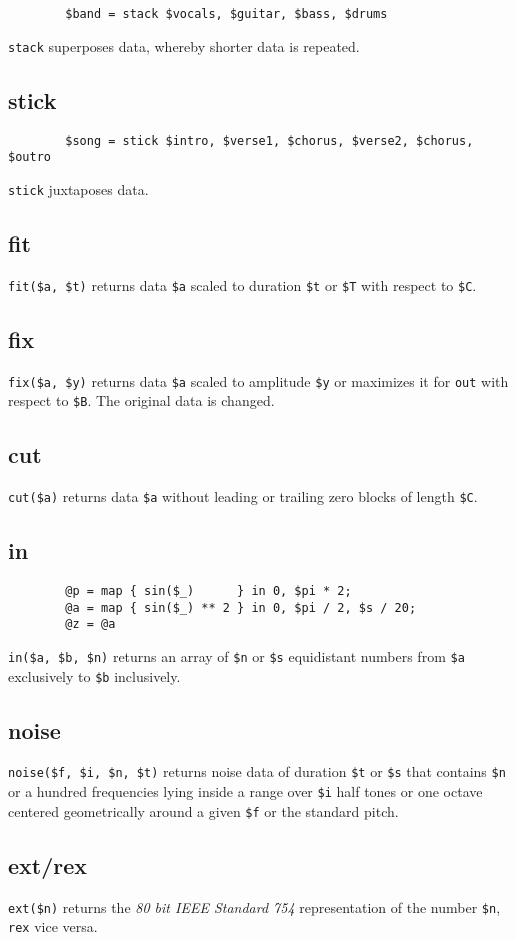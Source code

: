 \documentclass[a4paper, 10pt]{article}
\begin{document}
	\begin{verbatim}
		$band = stack $vocals, $guitar, $bass, $drums
	\end{verbatim}
	\verb|stack| superposes data, whereby shorter data is repeated.

	\subsection*{stick}

	\begin{verbatim}
		$song = stick $intro, $verse1, $chorus, $verse2, $chorus, $outro
	\end{verbatim}
	\verb|stick| juxtaposes data.

	\subsection*{fit}

	\verb|fit($a, $t)| returns data \verb|$a| scaled to duration \verb|$t| or \verb|$T| with respect to \verb|$C|.

	\subsection*{fix}

	\verb|fix($a, $y)| returns data \verb|$a| scaled to amplitude \verb|$y| or maximizes it for \verb|out| with respect to \verb|$B|. The original data is changed.

	\subsection*{cut}

	\verb|cut($a)| returns data \verb|$a| without leading or trailing zero blocks of length \verb|$C|.

	\subsection*{in}

	\begin{verbatim}
		@p = map { sin($_)      } in 0, $pi * 2;
		@a = map { sin($_) ** 2 } in 0, $pi / 2, $s / 20;
		@z = @a
	\end{verbatim}
	\verb|in($a, $b, $n)| returns an array of \verb|$n| or \verb|$s| equidistant numbers from \verb|$a| exclusively to \verb|$b| inclusively.

	\subsection*{noise}

	\verb|noise($f, $i, $n, $t)| returns noise data of duration \verb|$t| or \verb|$s| that contains \verb|$n| or a hundred frequencies lying inside a range over \verb|$i| half tones or one octave centered geometrically around a given \verb|$f| or the standard pitch.

	\subsection*{ext/rex}

	\verb|ext($n)| returns the {\it 80 bit IEEE Standard 754} representation of the number \verb|$n|, \verb|rex| vice versa.
\end{document}
